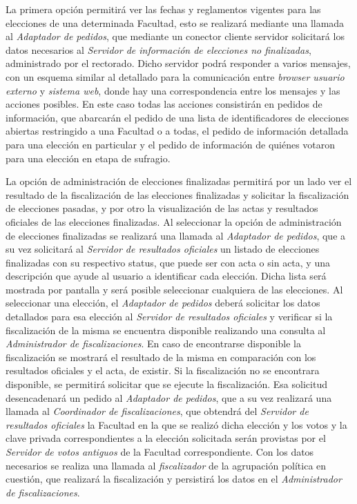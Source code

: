 La primera opción permitirá ver las fechas y reglamentos vigentes para las elecciones de una determinada Facultad, esto se realizará mediante una llamada al \emph{Adaptador de pedidos}, que mediante un conector cliente servidor solicitará los datos necesarios al \emph{Servidor de información de elecciones no finalizadas}, administrado por el rectorado.  Dicho servidor podrá responder a varios mensajes, con un esquema similar al detallado para la comunicación entre \emph{browser usuario externo} y \emph{sistema web}, donde hay una correspondencia entre los mensajes y las acciones posibles. En este caso todas las acciones consistirán en pedidos de información, que abarcarán el pedido de una lista de identificadores de elecciones abiertas restringido a una Facultad o a todas, el pedido de información detallada para una elección en particular y el pedido de información de quiénes votaron para una elección en etapa de sufragio.



La opción de administración de elecciones finalizadas permitirá por un lado ver el resultado de la fiscalización de las elecciones finalizadas y solicitar la fiscalización de elecciones pasadas, y por otro la visualización de las actas y resultados oficiales de las elecciones finalizadas. Al seleccionar la opción de administración de elecciones finalizadas se realizará una llamada al \emph{Adaptador de pedidos}, que a su vez solicitará al \emph{Servidor de resultados oficiales} un listado de elecciones finalizadas con su respectivo status, que puede ser con acta o sin acta, y una descripción que ayude al usuario a identificar cada elección. Dicha lista será mostrada por pantalla y será posible seleccionar cualquiera de las elecciones. Al seleccionar una elección, el \emph{Adaptador de pedidos} deberá solicitar los datos detallados para esa elección al \emph{Servidor de resultados oficiales} y verificar si la fiscalización de la misma se encuentra disponible realizando una consulta al \emph{Administrador de fiscalizaciones}. En caso de encontrarse disponible la fiscalización se mostrará el resultado de la misma en comparación con los resultados oficiales y el acta, de existir. Si la fiscalización no se encontrara disponible, se permitirá solicitar que se ejecute la fiscalización. Esa solicitud desencadenará un pedido al \emph{Adaptador de pedidos}, que a su vez realizará una llamada al \emph{Coordinador de fiscalizaciones}, que obtendrá del \emph{Servidor de resultados oficiales} la Facultad en la que se realizó dicha elección y los votos y la clave privada correspondientes a la elección solicitada serán provistas por el \emph{Servidor de votos antiguos} de la Facultad correspondiente. Con los datos necesarios se realiza una llamada al \emph{fiscalizador} de la agrupación política en cuestión, que realizará la fiscalización y persistirá los datos en el \emph{Administrador de fiscalizaciones}.

